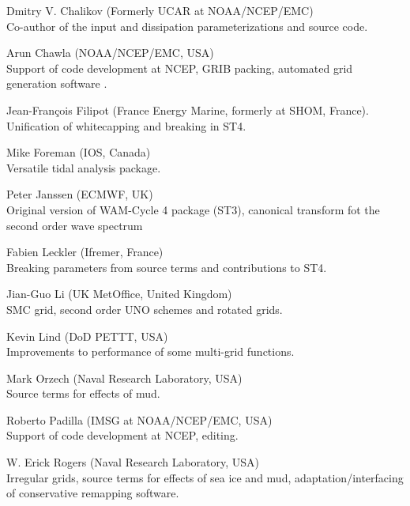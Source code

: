 \begin{list}{\ldots}{ }
\item [Dmitry V. Chalikov] (Formerly UCAR at NOAA/NCEP/EMC) \\ Co-author of the
  \cite{tol:JPO96} input and dissipation parameterizations and source code.

\item [Arun Chawla](NOAA/NCEP/EMC, USA) \\
  Support of code development at NCEP, GRIB packing, automated grid generation
  software \citep{tol:MMAB07a, tol:OMOD08a}.

\item [Jean-Fran{\c c}ois Filipot] (France Energy Marine, formerly at SHOM, France).\\
  Unification of whitecapping and breaking in ST4. 

\item [Mike Foreman]  (IOS, Canada) \\
  Versatile tidal analysis package. 

\item [Peter Janssen] (ECMWF, UK) \\
  Original version of WAM-Cycle 4 package (ST3), canonical transform fot the second order wave spectrum 

\item [Fabien Leckler] (Ifremer, France) \\
  Breaking parameters from source terms and contributions to ST4.

\item [Jian-Guo Li] (UK MetOffice, United Kingdom) \\
  SMC grid, second order UNO schemes and rotated grids.

\item [Kevin Lind]  (DoD PETTT, USA)\\ 
  Improvements to performance of some multi-grid functions.

\item [Mark Orzech]  (Naval Research Laboratory, USA)\\ 
  Source terms for effects of mud.

\item [Roberto Padilla]  (IMSG at NOAA/NCEP/EMC, USA)\\ 
  Support of code development at NCEP, editing.
   
\item [W. Erick Rogers]  (Naval Research Laboratory, USA)\\ 
  Irregular grids, source terms for effects of sea ice and mud, 
  adaptation/interfacing of conservative remapping software.


\end{list}
